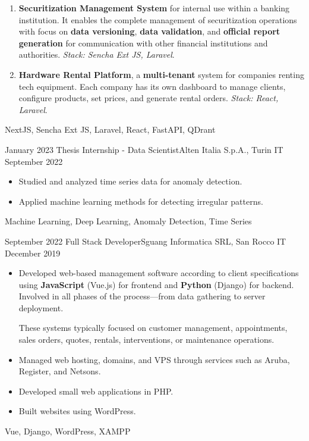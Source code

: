 \begin{experiences}
{\begin{itemize}
\begin{enumerate}
	\item \textbf{Securitization Management System} for internal use within a banking institution. It enables the complete management of securitization operations with focus on \textbf{data versioning}, \textbf{data validation}, and \textbf{official report generation} for communication with other financial institutions and authorities. \textit{Stack: Sencha Ext JS, Laravel}.

	\item \textbf{Hardware Rental Platform}, a \textbf{multi-tenant} system for companies renting tech equipment. Each company has its own dashboard to manage clients, configure products, set prices, and generate rental orders. \textit{Stack: React, Laravel}.
	\end{enumerate}
	\end{itemize}
}
{NextJS, Sencha Ext JS, Laravel, React, FastAPI, QDrant}

\emptySeparator
\emptySeparator

\experience
{January 2023}   {Thesis Internship - Data Scientist}{Alten Italia S.p.A., Turin IT}
{September 2022} {
	\begin{itemize}
		\item Studied and analyzed time series data for anomaly detection.
		\item Applied machine learning methods for detecting irregular patterns.
	\end{itemize}
}
{Machine Learning, Deep Learning, Anomaly Detection, Time Series}

\emptySeparator
\emptySeparator

\experience
{September 2022}   {Full Stack Developer}{Sguang Informatica SRL, San Rocco IT}
{December 2019} {
	\begin{itemize}
		\item Developed web-based management software according to client specifications using \textbf{JavaScript} (Vue.js) for frontend and \textbf{Python} (Django) for backend. Involved in all phases of the process—from data gathering to server deployment.

		These systems typically focused on customer management, appointments, sales orders, quotes, rentals, interventions, or maintenance operations.
		
		\item Managed web hosting, domains, and VPS through services such as Aruba, Register, and Netsons.
		\item Developed small web applications in PHP.
		\item Built websites using WordPress.
	\end{itemize}
}
{Vue, Django, WordPress, XAMPP}

\end{experiences}
